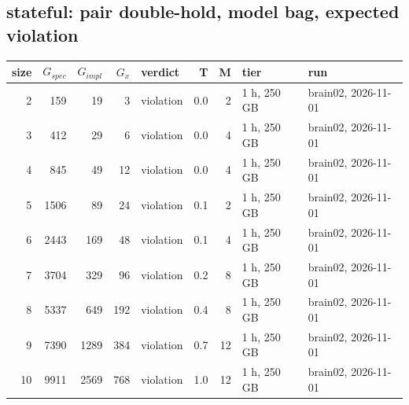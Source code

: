 \documentclass[10pt]{article}
\begin{document}
\subsection*{stateful: pair \textsf{double-hold}, model bag, expected violation}
\begin{longtable}{@{}rrrrlrrll@{}}
\toprule
size & $G_{\mathit{spec}}$ & $G_{\mathit{impl}}$ & $G_x$ & verdict & T & M & tier & run \\
\midrule
\endhead
\color{blue} 2 & 159 & 19 & 3 & violation & 0.0 & 2 & 1 h, 250 GB & brain02, 2026-11-01 \\
\color{blue} 3 & 412 & 29 & 6 & violation & 0.0 & 4 & 1 h, 250 GB & brain02, 2026-11-01 \\
\color{blue} 4 & 845 & 49 & 12 & violation & 0.0 & 4 & 1 h, 250 GB & brain02, 2026-11-01 \\
\color{blue} 5 & 1506 & 89 & 24 & violation & 0.1 & 2 & 1 h, 250 GB & brain02, 2026-11-01 \\
\color{blue} 6 & 2443 & 169 & 48 & violation & 0.1 & 4 & 1 h, 250 GB & brain02, 2026-11-01 \\
\color{blue} 7 & 3704 & 329 & 96 & violation & 0.2 & 8 & 1 h, 250 GB & brain02, 2026-11-01 \\
\color{blue} 8 & 5337 & 649 & 192 & violation & 0.4 & 8 & 1 h, 250 GB & brain02, 2026-11-01 \\
\color{blue} 9 & 7390 & 1289 & 384 & violation & 0.7 & 12 & 1 h, 250 GB & brain02, 2026-11-01 \\
\color{blue} 10 & 9911 & 2569 & 768 & violation & 1.0 & 12 & 1 h, 250 GB & brain02, 2026-11-01 \\
\bottomrule
\end{longtable}
\end{document}
